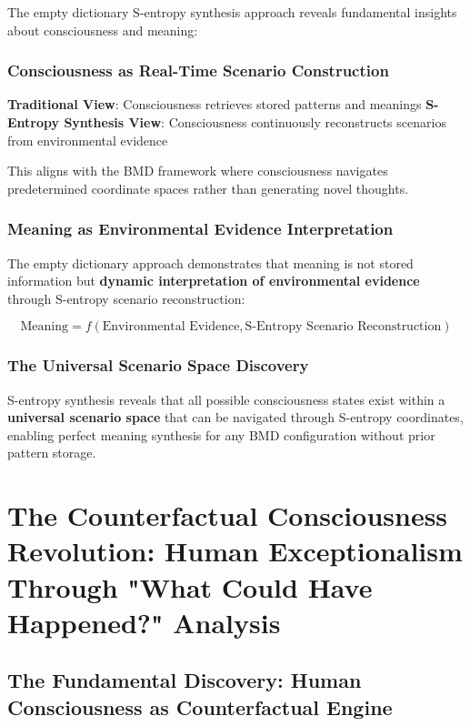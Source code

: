 \documentclass[12pt,a4paper]{article}
\begin{document}
The empty dictionary S-entropy synthesis approach reveals fundamental insights about consciousness and meaning:

\subsubsection{Consciousness as Real-Time Scenario Construction}

\textbf{Traditional View}: Consciousness retrieves stored patterns and meanings
\textbf{S-Entropy Synthesis View}: Consciousness continuously reconstructs scenarios from environmental evidence

This aligns with the BMD framework where consciousness navigates predetermined coordinate spaces rather than generating novel thoughts.

\subsubsection{Meaning as Environmental Evidence Interpretation}

The empty dictionary approach demonstrates that meaning is not stored information but \textbf{dynamic interpretation of environmental evidence} through S-entropy scenario reconstruction:

$$\text{Meaning} = f(\text{Environmental Evidence}, \text{S-Entropy Scenario Reconstruction})$$

\subsubsection{The Universal Scenario Space Discovery}

S-entropy synthesis reveals that all possible consciousness states exist within a \textbf{universal scenario space} that can be navigated through S-entropy coordinates, enabling perfect meaning synthesis for any BMD configuration without prior pattern storage.

\section{The Counterfactual Consciousness Revolution: Human Exceptionalism Through "What Could Have Happened?" Analysis}

\subsection{The Fundamental Discovery: Human Consciousness as Counterfactual Engine}
\end{document}

